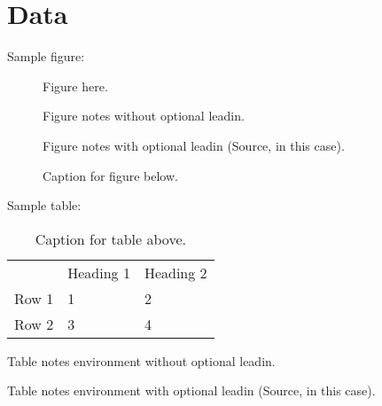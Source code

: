\section{Data}
\label{sec:data}

Sample figure:

\begin{figure}
Figure here.

\caption{Caption for figure below.}
\begin{figurenotes}
Figure notes without optional leadin.
\end{figurenotes}
\begin{figurenotes}[Source]
Figure notes with optional leadin (Source, in this case).
\end{figurenotes}
\end{figure}

Sample table:

\begin{table}
\caption{Caption for table above.}

\begin{tabular}{lll}
& Heading 1 & Heading 2 \\
Row 1 & 1 & 2 \\
Row 2 & 3 & 4%
\end{tabular}
\begin{tablenotes}
Table notes environment without optional leadin.
\end{tablenotes}
\begin{tablenotes}[Source]
Table notes environment with optional leadin (Source, in this case).
\end{tablenotes}
\end{table}
